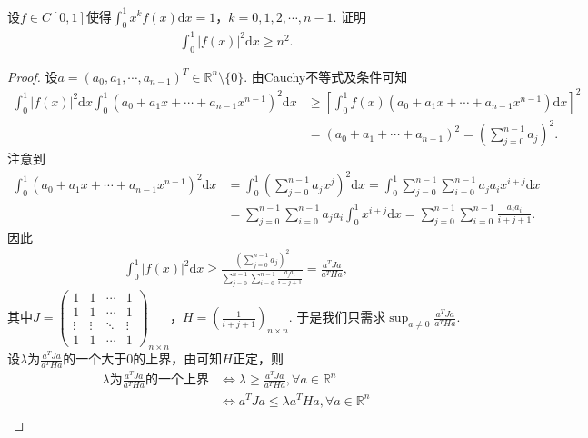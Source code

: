 \documentclass[../../main.tex]{subfiles}
\begin{document}
\begin{example}
设$f\in C[0,1]$使得$\int_{0}^{1}x^{k}f(x)\mathrm{d}x = 1$，$k = 0,1,2,\cdots,n - 1$. 证明
\begin{align*}
\int_{0}^{1}|f(x)|^{2}\mathrm{d}x\geqslant n^{2}.
\end{align*}
\end{example}
\begin{proof}
设$a=(a_0,a_1,\cdots,a_{n-1})^T\in\mathbb{R}^n\setminus\{0\}$. 由Cauchy不等式及条件可知
\begin{align*}
\int_0^1 |f(x)|^2\mathrm{d}x \int_0^1 (a_0 + a_1x + \cdots + a_{n-1}x^{n-1})^2\mathrm{d}x &\geqslant \left[ \int_0^1 f(x)(a_0 + a_1x + \cdots + a_{n-1}x^{n-1})\mathrm{d}x \right]^2 \\
&= (a_0 + a_1 + \cdots + a_{n-1})^2 = \left( \sum_{j=0}^{n-1}a_j \right)^2.
\end{align*}
注意到
\begin{align*}
\int_0^1 (a_0 + a_1x + \cdots + a_{n-1}x^{n-1})^2\mathrm{d}x &= \int_0^1 \left( \sum_{j=0}^{n-1}a_jx^j \right)^2\mathrm{d}x = \int_0^1 \sum_{j=0}^{n-1}\sum_{i=0}^{n-1}a_ja_ix^{i+j}\mathrm{d}x \\
&= \sum_{j=0}^{n-1}\sum_{i=0}^{n-1}a_ja_i \int_0^1 x^{i+j}\mathrm{d}x = \sum_{j=0}^{n-1}\sum_{i=0}^{n-1}\frac{a_ja_i}{i+j+1}.
\end{align*}
因此
\begin{align*}
\int_0^1 |f(x)|^2\mathrm{d}x \geqslant \frac{\left( \sum\limits_{j=0}^{n-1}a_j \right)^2}{\sum\limits_{j=0}^{n-1}\sum\limits_{i=0}^{n-1}\frac{a_ja_i}{i+j+1}} = \frac{a^TJa}{a^THa},
\end{align*}
其中$J=\begin{pmatrix}1 & 1 & \cdots & 1 \\ 1 & 1 & \cdots & 1 \\ \vdots & \vdots & \ddots & \vdots \\ 1 & 1 & \cdots & 1\end{pmatrix}_{n\times n}$，$H=\left( \frac{1}{i+j+1} \right)_{n\times n}$. 于是我们只需求$\sup_{a\neq 0}\frac{a^TJa}{a^THa}$. 设$\lambda$为$\frac{a^TJa}{a^THa}$的一个大于$0$的上界，由可知$H$正定，则
\begin{align*}
\lambda \text{为}\frac{a^TJa}{a^THa}\text{的一个上界} &\Longleftrightarrow \lambda \geqslant \frac{a^TJa}{a^THa}, \forall a\in\mathbb{R}^n \\
&\Longleftrightarrow a^TJa \leqslant \lambda a^THa, \forall a\in\mathbb{R}^n \\

\end{align*}
\end{proof}
\end{document}
